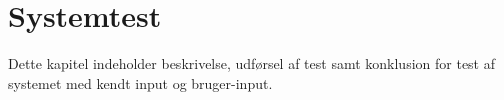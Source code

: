 \chapter{Systemtest}
Dette kapitel indeholder beskrivelse, udførsel af test samt konklusion for test af systemet med kendt input og bruger-input. 



